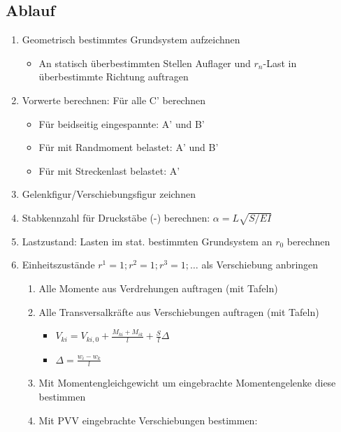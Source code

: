 \documentclass[fleqn,twoside]{article}
\begin{document}
    \subsection{Ablauf}
        \begin{enumerate}
            \item Geometrisch bestimmtes Grundsystem aufzeichnen
                \begin{itemize}
                    \item An statisch überbestimmten Stellen Auflager und $r_n$-Last in überbestimmte Richtung auftragen
                \end{itemize}
            \item Vorwerte berechnen: Für alle C' berechnen
                \begin{itemize}
                    \item Für beidseitig eingespannte: A' und B'
                    \item Für mit Randmoment belastet: A' und B'
                    \item Für mit Streckenlast belastet: A'
                \end{itemize}
            \item Gelenkfigur/Verschiebungsfigur zeichnen
            \item Stabkennzahl für Druckstäbe (-) berechnen: $\alpha= L \sqrt{S/EI}$
            \item Lastzustand: Lasten im stat. bestimmten Grundsystem an $r_0$ berechnen
            \item Einheitszustände $r^1=1 ; r^2=1 ; r^3=1 ; \ldots$ als Verschiebung anbringen
                \begin{enumerate}
                    \item Alle Momente aus Verdrehungen auftragen (mit Tafeln)
                    \item Alle Transversalkräfte aus Verschiebungen auftragen (mit Tafeln)
                        \begin{itemize}
                            \item $V_{ki} = V_{ki,0} + \frac{M_{ki} + M_{ik}}{l} + \frac{S}{l} \Delta$
                            \item $\Delta = \frac{w_i - w_k}{l}$
                        \end{itemize}
                    \item Mit Momentengleichgewicht um eingebrachte Momentengelenke diese bestimmen
                    \item Mit PVV eingebrachte Verschiebungen bestimmen:

\end{enumerate}
\end{enumerate}
\end{document}
